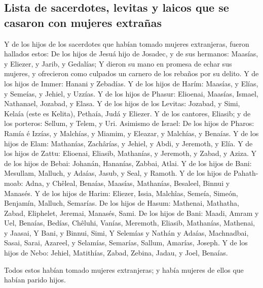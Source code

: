\hypertarget{lista-de-sacerdotes-levitas-y-laicos-que-se-casaron-con-mujeres-extrauxf1as}{%
\subsection{Lista de sacerdotes, levitas y laicos que se casaron con
mujeres
extrañas}\label{lista-de-sacerdotes-levitas-y-laicos-que-se-casaron-con-mujeres-extrauxf1as}}

 Y de los hijos de los sacerdotes que habían tomado mujeres
extranjeras, fueron hallados estos: De los hijos de Jesuá hijo de
Josadec, y de sus hermanos: Maasías, y Eliezer, y Jarib, y Gedalías;
 Y dieron su mano en promesa de echar sus mujeres, y
ofrecieron como culpados un carnero de los rebaños por su delito.
 Y de los hijos de Immer: Hanani y Zebadías. 
Y de los hijos de Harím: Maasías, y Elías, y Semeías, y Jehiel, y
Uzzías.  Y de los hijos de Phasur: Elioenai, Maasías,
Ismael, Nathanael, Jozabad, y Elasa.  Y de los hijos de los
Levitas: Jozabad, y Simi, Kelaía (este es Kelita), Pethaía, Judá y
Eliezer.  Y de los cantores, Eliasib; y de los porteros:
Sellum, y Telem, y Uri.  Asimismo de Israel: De los hijos
de Pharos: Ramía é Izzías, y Malchías, y Miamim, y Eleazar, y Malchías,
y Benaías.  Y de los hijos de Elam: Mathanías, Zachârías, y
Jehiel, y Abdi, y Jeremoth, y Elía.  Y de los hijos de
Zattu: Elioenai, Eliasib, Mathanías, y Jeremoth, y Zabad, y Aziza.
 Y de los hijos de Bebai: Johanán, Hananías, Zabbai, Atlai.
 Y de los hijos de Bani: Mesullam, Malluch, y Adaías,
Jasub, y Seal, y Ramoth.  Y de los hijos de Pahath-moab:
Adna, y Chêleal, Benaías, Maasías, Mathanías, Besaleel, Binnui y
Manasés.  Y de los hijos de Harim: Eliezer, Issia,
Malchîas, Semeía, Simeón,  Benjamín, Malluch, Semarías.
 De los hijos de Hasum: Mathenai, Mathatha, Zabad,
Eliphelet, Jeremai, Manasés, Sami.  De los hijos de Bani:
Maadi, Amram y Uel,  Benaías, Bedías, Chêluhi,
 Vanías, Meremoth, Eliasib,  Mathanías,
Mathenai, y Jaasai,  Y Bani, y Binnui, Simi, 
Y Selemías y Nathán y Adaías,  Machnadbai, Sasai, Sarai,
 Azareel, y Selamías, Semarías,  Sallum,
Amarías, Joseph.  Y de los hijos de Nebo: Jehiel,
Matithías, Zabad, Zebina, Jadau, y Joel, Benaías.

 Todos estos habían tomado mujeres extranjeras; y había
mujeres de ellos que habían parido hijos.
